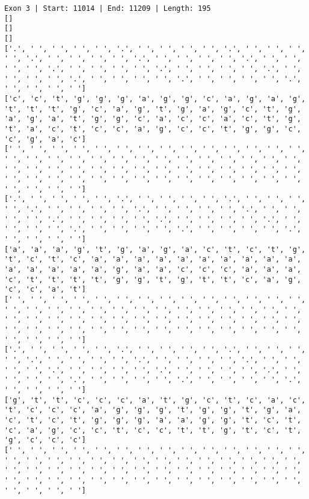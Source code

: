 \documentclass{article}
\begin{document}
\begin{Verbatim}
Exon 3 | Start: 11014 | End: 11209 | Length: 195
[]
[]
[]
['.', ' ', ' ', ' ', ' ', '.', ' ', ' ', ' ', ' ', '.', ' ', ' ', ' ', ' ', '.', ' ', ' ', ' ', ' ', '.', ' ', ' ', ' ', ' ', '.', ' ', ' ', ' ', ' ', '.', ' ', ' ', ' ', ' ', '.', ' ', ' ', ' ', ' ', '.', ' ', ' ', ' ', ' ', '.', ' ', ' ', ' ', ' ', '.', ' ', ' ', ' ', ' ', '.', ' ', ' ', ' ', ' ']
['c', 'c', 't', 'g', 'g', 'g', 'a', 'g', 'g', 'c', 'a', 'g', 'a', 'g', 't', 't', 't', 'g', 'c', 'a', 'g', 't', 'g', 'a', 'g', 'c', 't', 'g', 'a', 'g', 'a', 't', 'g', 'g', 'c', 'a', 'c', 'c', 'a', 'c', 't', 'g', 't', 'a', 'c', 't', 'c', 'c', 'a', 'g', 'c', 'c', 't', 'g', 'g', 'c', 'c', 'g', 'a', 'c']
[' ', ' ', ' ', ' ', ' ', ' ', ' ', ' ', ' ', ' ', ' ', ' ', ' ', ' ', ' ', ' ', ' ', ' ', ' ', ' ', ' ', ' ', ' ', ' ', ' ', ' ', ' ', ' ', ' ', ' ', ' ', ' ', ' ', ' ', ' ', ' ', ' ', ' ', ' ', ' ', ' ', ' ', ' ', ' ', ' ', ' ', ' ', ' ', ' ', ' ', ' ', ' ', ' ', ' ', ' ', ' ', ' ', ' ', ' ', ' ']
['.', ' ', ' ', ' ', ' ', '.', ' ', ' ', ' ', ' ', '.', ' ', ' ', ' ', ' ', '.', ' ', ' ', ' ', ' ', '.', ' ', ' ', ' ', ' ', '.', ' ', ' ', ' ', ' ', '.', ' ', ' ', ' ', ' ', '.', ' ', ' ', ' ', ' ', '.', ' ', ' ', ' ', ' ', '.', ' ', ' ', ' ', ' ', '.', ' ', ' ', ' ', ' ', '.', ' ', ' ', ' ', ' ']
['a', 'a', 'a', 'g', 't', 'g', 'a', 'g', 'a', 'c', 't', 'c', 't', 'g', 't', 'c', 't', 'c', 'a', 'a', 'a', 'a', 'a', 'a', 'a', 'a', 'a', 'a', 'a', 'a', 'a', 'a', 'a', 'g', 'a', 'a', 'c', 'c', 'c', 'a', 'a', 'a', 'c', 't', 't', 't', 't', 'g', 'g', 't', 'g', 't', 't', 'c', 'a', 'g', 'c', 'c', 'a', 't']
[' ', ' ', ' ', ' ', ' ', ' ', ' ', ' ', ' ', ' ', ' ', ' ', ' ', ' ', ' ', ' ', ' ', ' ', ' ', ' ', ' ', ' ', ' ', ' ', ' ', ' ', ' ', ' ', ' ', ' ', ' ', ' ', ' ', ' ', ' ', ' ', ' ', ' ', ' ', ' ', ' ', ' ', ' ', ' ', ' ', ' ', ' ', ' ', ' ', ' ', ' ', ' ', ' ', ' ', ' ', ' ', ' ', ' ', ' ', ' ']
['.', ' ', ' ', ' ', ' ', '.', ' ', ' ', ' ', ' ', '.', ' ', ' ', ' ', ' ', '.', ' ', ' ', ' ', ' ', '.', ' ', ' ', ' ', ' ', '.', ' ', ' ', ' ', ' ', '.', ' ', ' ', ' ', ' ', '.', ' ', ' ', ' ', ' ', '.', ' ', ' ', ' ', ' ', '.', ' ', ' ', ' ', ' ', '.', ' ', ' ', ' ', ' ', '.', ' ', ' ', ' ', ' ']
['g', 't', 't', 'c', 'c', 'c', 'a', 't', 'g', 'c', 't', 'c', 'a', 'c', 't', 'c', 'c', 'c', 'a', 'g', 'g', 'g', 't', 'g', 'g', 't', 'g', 'a', 'c', 't', 'c', 't', 'g', 'g', 'g', 'a', 'a', 'g', 'g', 't', 'c', 't', 'c', 'a', 'g', 'c', 'c', 't', 'c', 'c', 't', 't', 'g', 't', 'c', 't', 'g', 'c', 'c', 'c']
[' ', ' ', ' ', ' ', ' ', ' ', ' ', ' ', ' ', ' ', ' ', ' ', ' ', ' ', ' ', ' ', ' ', ' ', ' ', ' ', ' ', ' ', ' ', ' ', ' ', ' ', ' ', ' ', ' ', ' ', ' ', ' ', ' ', ' ', ' ', ' ', ' ', ' ', ' ', ' ', ' ', ' ', ' ', ' ', ' ', ' ', ' ', ' ', ' ', ' ', ' ', ' ', ' ', ' ', ' ', ' ', ' ', ' ', ' ', ' ']

\end{Verbatim}
\end{document}
